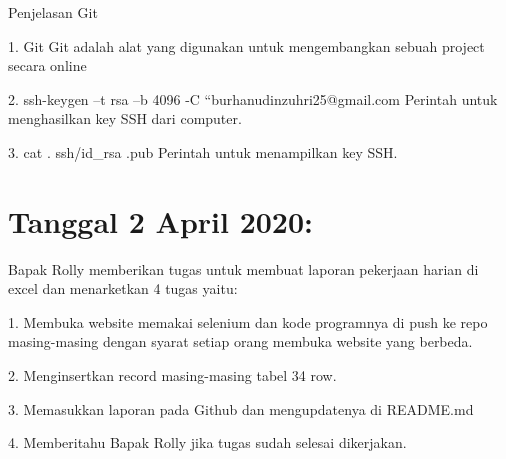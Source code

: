 \documentclass{article}
\begin{document}
    \item Penjelasan Git
    \newline
        \item 1. Git
            \newline
            Git adalah alat yang digunakan untuk mengembangkan sebuah project secara online
            \newline
        \item 2. ssh-keygen –t rsa –b 4096 -C “burhanudinzuhri25@gmail.com
            \newline
            Perintah untuk menghasilkan key SSH dari computer.
            \newline
        \item 3. cat . ssh/id_rsa .pub
            \newline
            Perintah untuk menampilkan key SSH.
            \newline



\section{Tanggal 2 April 2020:}
Bapak Rolly memberikan tugas untuk membuat laporan pekerjaan harian di excel dan menarketkan 4 tugas yaitu:
    \newline
    \newline
        \item 1.	Membuka website memakai selenium dan kode programnya di push ke repo masing-masing dengan syarat setiap orang membuka website yang berbeda.
            \newline
        \item 2.	Menginsertkan record masing-masing tabel 34 row.
            \newline
        \item 3.	Memasukkan laporan pada Github dan mengupdatenya di README.md
            \newline
        \item 4.	Memberitahu Bapak Rolly jika tugas sudah selesai dikerjakan. 
            \newline
        
\end{document}

